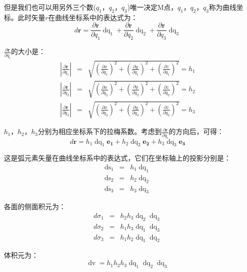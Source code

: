 \documentclass[UTF8]{ctexart}
\newcommand{\tmmathbf}[1]{\ensuremath{\boldsymbol{#1}}}
\newcommand{\tmop}[1]{\ensuremath{\operatorname{#1}}}
\begin{document}
但是我们也可以用另外三个数($q_1 ，q_2
，q_3$)唯一决定M点，$q_1 ，q_2
，q_3$称为曲线坐标。此时矢量$r$在曲线坐标系中的表达式为：
\[ d \tmmathbf{r} = \frac{\partial \tmmathbf{r}}{\partial q_1} \tmop{dq}_1 +
   \frac{\partial \tmmathbf{r}}{\partial q_2} \tmop{dq}_2 + \frac{\partial
   \tmmathbf{r}}{\partial q_3} \tmop{dq}_3 \]


$\frac{\partial \tmmathbf{r}}{\partial q_i}$的大小是：
\begin{eqnarray*}
  \left| \frac{\partial \tmmathbf{r}}{\partial q_1} \right| & = & \sqrt{\left(
  \frac{\partial x}{\partial q_1} \right)^2 + \left( \frac{\partial
  y}{\partial q_1} \right)^2 + \left( \frac{\partial z}{\partial q_1}
  \right)^2} = h_1\\
  \left| \frac{\partial \tmmathbf{r}}{\partial q_2} \right| & = & \sqrt{\left(
  \frac{\partial x}{\partial q_2} \right)^2 + \left( \frac{\partial
  y}{\partial q_2} \right)^2 + \left( \frac{\partial z}{\partial q_2}
  \right)^2} = h_2\\
  \left| \frac{\partial \tmmathbf{r}}{\partial q_3} \right| & = & \sqrt{\left(
  \frac{\partial x}{\partial q_3} \right)^2 + \left( \frac{\partial
  y}{\partial q_3} \right)^2 + \left( \frac{\partial z}{\partial q_3}
  \right)^2} = h_3
\end{eqnarray*}


$h_1 ，h_2
，h_3$分别为相应坐标系下的拉梅系数。考虑到$\frac{\partial
\tmmathbf{r}}{\partial q_i}$的方向后，可得：
\[ d \tmmathbf{r} = h_1 \tmop{dq}_1 \tmmathbf{e_1} + h_2 \tmop{dq}_2
   \tmmathbf{e_2} + h_3 \tmop{dq}_3 \tmmathbf{e_3} \]


这是弧元素矢量在曲线坐标系中的表达式，它们在坐标轴上的投影分别是：
\begin{eqnarray*}
  \tmop{ds}_1 & = & h_1 \tmop{dq}_1\\
  \tmop{ds}_2 & = & h_2 \tmop{dq}_2\\
  \tmop{ds}_3 & = & h_3 \tmop{dq}_3
\end{eqnarray*}


各面的侧面积元为：
\begin{eqnarray*}
  d \sigma_1 & = & h_2 h_3 \tmop{dq}_2 \tmop{dq}_3\\
  d \sigma_2 & = & h_1 h_3 \tmop{dq}_1 \tmop{dq}_3\\
  d \sigma_3 & = & h_1 h_2 \tmop{dq}_1 \tmop{dq}_2
\end{eqnarray*}


体积元为：
\[ \tmop{dv} = h_1 h_2 h_3 \tmop{dq}_1 \tmop{dq}_2 \tmop{dq}_3 \]
\end{document}
